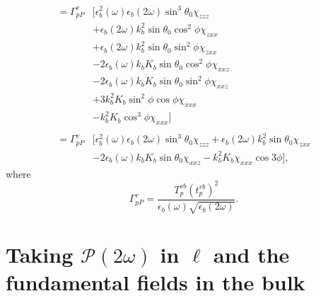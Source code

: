 \begin{equation*}
\begin{split}
= \Gamma^{v}_{pP}&\big[
    \epsilon^{2}_{b}(\omega)\epsilon_{b}
    (2\omega)\sin^{3}\theta_{0}\chi_{zzz}\\
&+  \epsilon_{b}(2\omega)k^{2}_{b}
    \sin\theta_{0}\cos^{2}\phi\chi_{zxx}\\
&+  \epsilon_{b}(2\omega)k^{2}_{b}
    \sin\theta_{0}\sin^{2}\phi\chi_{zxx}\\
&- 2\epsilon_{b}(\omega)k_{b}K_{b}
    \sin\theta_{0}\cos^{2}\phi\chi_{xxz}\\
&- 2\epsilon_{b}(\omega)k_{b}K_{b}
    \sin\theta_{0}\sin^{2}\phi\chi_{xxz}\\
&+ 3k^{2}_{b}K_{b}\sin^{2}\phi\cos\phi\chi_{xxx}\\
&-  k^{2}_{b}K_{b}\cos^{3}\phi\chi_{xxx}
\big]\\\\
= \Gamma^{v}_{pP}&\big[
    \epsilon^{2}_{b}(\omega)\epsilon_{b}(2\omega)
    \sin^{3}\theta_{0}\chi_{zzz}
 +  \epsilon_{b}(2\omega)k^{2}_{b}\sin\theta_{0}\chi_{zxx}\\
&- 2\epsilon_{b}(\omega)k_{b}K_{b}\sin\theta_{0}\chi_{xxz}
 -  k^{2}_{b}K_{b}\chi_{xxx}\cos3\phi
\big],
\end{split}
\end{equation*}
where
\begin{equation*}
\Gamma^{v}_{pP} =
\frac{T^{v b}_{p}\left(t^{v b}_{p}\right)^{2}}
     {\epsilon_{b}(\omega)\sqrt{\epsilon_{b}(2\omega)}}.
\end{equation*}


\section{Taking \texorpdfstring{$\mathcal{P}(2\omega)$}{P(2w)} in
\texorpdfstring{$\ell$}{l} and the fundamental fields in the bulk}

